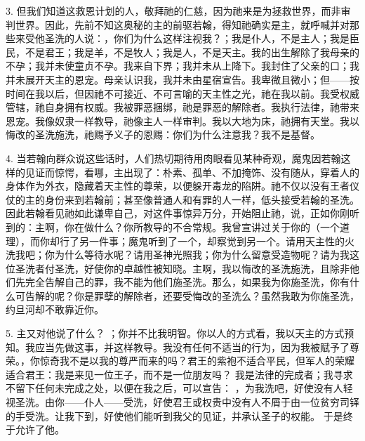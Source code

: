 3. 但我们知道这救恩计划的人，敬拜祂的仁慈，因为祂来是为拯救世界，而非审判世界。因此，先前不知这奥秘的主的前驱若翰，得知祂确实是主，就呼喊并对那些来受他圣洗的人说：，你们为什么这样注视我？；我是仆人，不是主人；我是臣民，不是君王；我是羊，不是牧人；我是人，不是天主。我的出生解除了我母亲的不孕；我并未使童贞不孕。我来自下界；我并未从上降下。我封住了父亲的口；我并未展开天主的恩宠。母亲认识我，我并未由星宿宣告。我卑微且微小；但——按时间在我以后，但因祂不可接近、不可言喻的天主性之光，祂在我以前。我受权威管辖，祂自身拥有权威。我被罪恶捆绑，祂是罪恶的解除者。我执行法律，祂带来恩宠。我像奴隶一样教导，祂像主人一样审判。我以大地为床，祂拥有天堂。我以悔改的圣洗施洗，祂赐予义子的恩赐：你们为什么注意我？我不是基督。\par

4. 当若翰向群众说这些话时，人们热切期待用肉眼看见某种奇观，魔鬼因若翰这样的见证而惊愕，看哪，主出现了：朴素、孤单、不加掩饰、没有随从，穿着人的身体作为外衣，隐藏着天主性的尊荣，以便躲开毒龙的陷阱。祂不仅以没有王者仪仗的主的身份来到若翰前；甚至像普通人和有罪的人一样，低头接受若翰的圣洗。因此若翰看见祂如此谦卑自己，对这件事惊异万分，开始阻止祂，说，正如你刚听到的：主啊，你在做什么？你所教导的不合常规。我曾宣讲过关于你的（一个道理），而你却行了另一件事；魔鬼听到了一个，却察觉到另一个。请用天主性的火洗我吧；你为什么等待水呢？请用圣神光照我；你为什么留意受造物呢？请为我这位圣洗者付圣洗，好使你的卓越性被知晓。主啊，我以悔改的圣洗施洗，且除非他们先完全告解自己的罪，我不能为他们施圣洗。那么，如果我为你施圣洗，你有什么可告解的呢？你是罪孽的解除者，还要受悔改的圣洗么？虽然我敢为你施圣洗，约旦河却不敢靠近你。\par

5. 主又对他说了什么？  ；你并不比我明智。你以人的方式看，我以天主的方式预知。我应当先做这事，并这样教导。我没有任何不适当的行为，因为我被赋予了尊荣。，你惊奇我不是以我的尊严而来的吗？君王的紫袍不适合平民，但军人的荣耀适合君王：我是来见一位王子，而不是一位朋友吗？ 我是法律的完成者；我寻求不留下任何未完成之处，以便在我之后，可以宣告：  ，为我洗吧，好使没有人轻视圣洗。由你——仆人——受洗，好使君王或权贵中没有人不屑于由一位贫穷司铎的手受洗。让我下到，好使他们能听到我父的见证，并承认圣子的权能。 于是终于允许了他。\par

